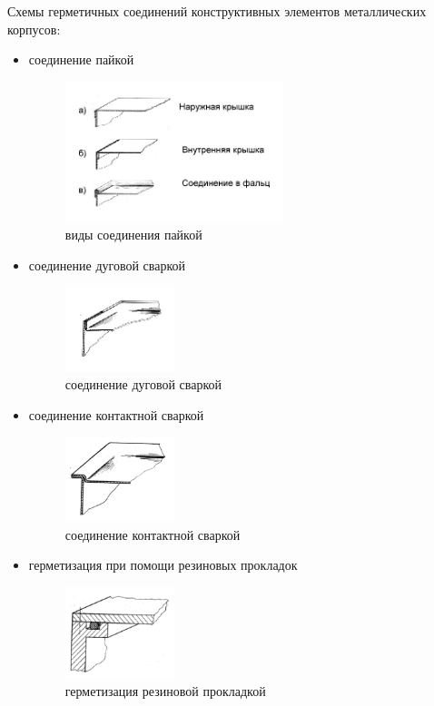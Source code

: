 \documentclass[unicode, 12pt, a4paper, oneside]{article}
\begin{document}
Схемы герметичных соединений конструктивных элементов металлических корпусов: 
\begin{itemize}
\item соединение пайкой
\begin{figure}[H]
\centering
\includegraphics[width=0.6\textwidth]{67_paiko.JPG}
\caption{виды соединения пайкой}
\end{figure}

\item соединение дуговой сваркой
\begin{figure}[H]
\centering
\includegraphics[width=0.3\textwidth]{67_dug_svar.JPG}
\caption{соединение дуговой сваркой}
\end{figure}
\item соединение контактной сваркой
\begin{figure}[H]
\centering
\includegraphics[width=0.3\textwidth]{67_kont_svar.JPG}
\caption{соединение контактной сваркой}
\end{figure}
\item герметизация при помощи резиновых прокладок
\begin{figure}[H]
\centering
\includegraphics[width=0.3\textwidth]{67_prokladka.JPG}
\caption{герметизация резиновой прокладкой}
\end{figure}
\end{itemize}
\end{document}
